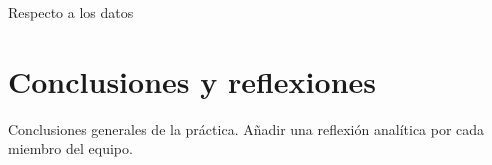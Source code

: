 \documentclass[sigconf]{acmart}
\begin{document}
Respecto a los datos 


\section{Conclusiones y reflexiones}

Conclusiones generales de la pr{\'a}ctica. A\~nadir una reflexi{\'o}n anal{\'i}tica por cada miembro del equipo.



\end{document}
